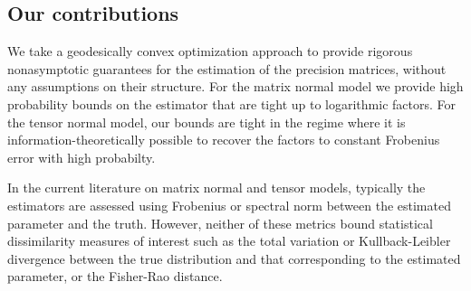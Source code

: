 \documentclass[aos]{imsart}
\theoremstyle{definition}
\numberwithin{equation}{section}
\begin{document}
\subsection{Our contributions}
We take a geodesically convex optimization approach to provide rigorous nonasymptotic guarantees for the estimation of the precision matrices, without any assumptions on their structure. For the matrix normal model we provide high probability bounds on the estimator that are tight up to logarithmic factors. For the tensor normal model, our bounds are tight in the regime where it is information-theoretically possible to recover the factors to constant Frobenius error with high probabilty.


In the current literature on matrix normal and tensor models, typically the estimators are assessed using Frobenius or spectral norm between the estimated parameter and the truth.
However, neither of these metrics bound statistical dissimilarity measures of interest such as the total variation or Kullback-Leibler divergence between the true distribution and that corresponding to the estimated parameter, or the Fisher-Rao distance.
\end{document}
